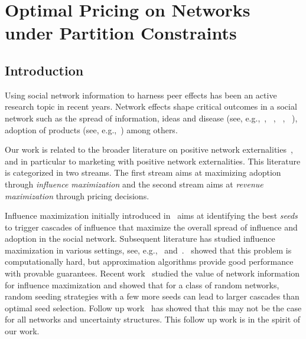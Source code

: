 \chapter{Optimal Pricing on Networks under Partition Constraints}\label{ch:pricing}


\section{Introduction}\label{sec:pricing:intro}

		Using social network information to harness peer effects has been an active research topic in recent years. Network effects shape critical outcomes in a social network such as the spread of information, ideas and disease (see, e.g.,~\cite{banerjee2013diffusion},
~\cite{pastor2001epidemic},
~\cite{muchnik2013social},
~\cite{chamley2004rational}), adoption of products (see, e.g.,~\cite{bapna2015your, rogers1976new, wang2016consumer}) among others.

	Our work is related to the broader literature on positive network externalities~\cite{farrell1985standardization},~\cite{katz1985network} and in particular to marketing with positive network
	externalities. This literature is categorized in two streams. The first stream aims at maximizing adoption through {\it influence maximization} and the second stream aims at {\it revenue maximization} through pricing decisions.
	
 Influence maximization initially introduced in~\cite{domingos2001mining} aims at identifying the best {\it seeds} to trigger cascades of influence that maximize the overall spread of influence and adoption in the social network. Subsequent literature has studied influence maximization in various settings, see, e.g.,~\cite{richardson2002mining} and~\cite{banerjee2013diffusion}.~\cite{kempe2003maximizing} showed that this problem is computationally hard, but approximation
	algorithms provide good performance with provable guarantees. Recent work~\cite{akbarpour2018} studied 
	the value of network information for influence maximization and showed that for a class of random networks, random seeding strategies with a few more seeds can lead to  larger cascades than optimal seed selection. Follow up work~\cite{Jackson-Storms-2017} has showed that this may not be the case for all networks and uncertainty structures. This follow up work is in the spirit of our work.
	
